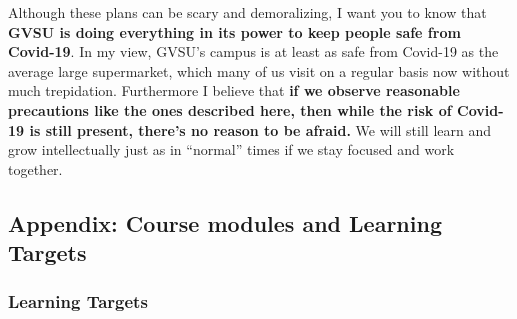 \documentclass[]{article}
\begin{document}
Although these plans can be scary and demoralizing, I want you to know
that \textbf{GVSU is doing everything in its power to keep people safe
from Covid-19}. In my view, GVSU's campus is at least as safe from
Covid-19 as the average large supermarket, which many of us visit on a
regular basis now without much trepidation. Furthermore I believe that
\textbf{if we observe reasonable precautions like the ones described
here, then while the risk of Covid-19 is still present, there's no
reason to be afraid.} We will still learn and grow intellectually just
as in ``normal'' times if we stay focused and work together.

\hypertarget{appendix-course-modules-and-learning-targets}{%
\subsection{Appendix: Course modules and Learning
Targets}\label{appendix-course-modules-and-learning-targets}}

\hypertarget{learning-targets}{%
\subsubsection{Learning Targets}\label{learning-targets}}
\end{document}

